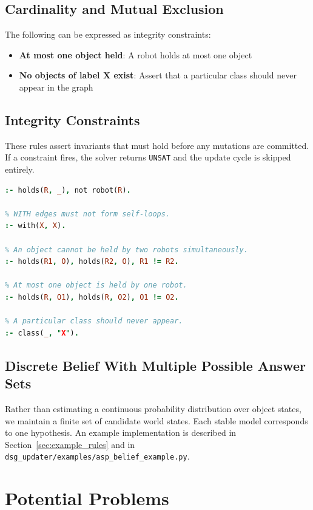 \documentclass{article}
\begin{document}
\subsection{Cardinality and Mutual Exclusion}

The following can be expressed as integrity constraints:

\begin{itemize}
    \item \textbf{At most one object held}: A robot holds at most one object
    \item \textbf{No objects of label X exist}: Assert that a particular class should never appear in the graph
\end{itemize}

\subsection{Integrity Constraints}

These rules assert invariants that must hold before any mutations are committed.
If a constraint fires, the solver returns \texttt{UNSAT} and the update cycle
is skipped entirely.

\begin{lstlisting}[language=Prolog]
% A HOLDS edge must point to a known robot.
:- holds(R, _), not robot(R).

% WITH edges must not form self-loops.
:- with(X, X).

% An object cannot be held by two robots simultaneously.
:- holds(R1, O), holds(R2, O), R1 != R2.

% At most one object is held by one robot.
:- holds(R, O1), holds(R, O2), O1 != O2.

% A particular class should never appear.
:- class(_, "X").
\end{lstlisting}

\subsection{Discrete Belief With Multiple Possible Answer Sets}

Rather than estimating a continuous probability distribution over object
states, we maintain a finite set of candidate world states. Each stable
model corresponds to one hypothesis. An example implementation is described
in Section~\ref{sec:example_rules} and in \texttt{dsg\_updater/examples/asp\_belief\_example.py}.

\section{Potential Problems}
\end{document}
